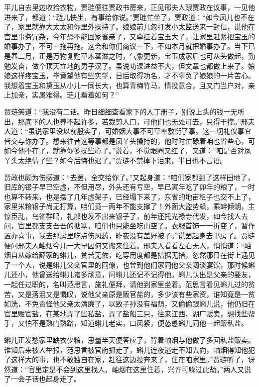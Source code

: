 \documentclass[12pt,oneside]{book}
\begin{document}
平儿自去里边收拾衣物，贾琏便往贾政书房来，正见邢夫人跟贾政在议事，一见他进来了，都道：“琏儿快坐，有事给你说。”贾琏忙坐了，贾政道：“如今凤儿也不在了，家里就靠大太太和你里外操持了。娘娘前儿忽打发小太监送来一封信，说他在宫里事务冗杂，今年恐不能回家省亲了，又牵挂着宝玉大了，让家里赶紧把宝玉的婚事办了，不可一拖再拖。这会和你们商议一下，不如本月就把婚事办了。当下已是春二月，正是万物复甦草木蕃滋之时，气象更新，宝玉成家后也可从头做起，勤勉发奋，做个顶天立地的男子汉了。虽说功课进益不大，但文章也都做上来了。娘娘这样疼宝玉，毕竟望他有些实学，日后取得功名，才不辜负了娘娘的一片苦心。我想着宝玉和黛玉从小儿一同长大，也算青梅竹马，情投意合，且又门当户对，亲上加亲，实属难得。琏儿看着如何？”

贾琏笑道：“我没有二话。昨日细细查看家下的人丁册子，别说上头的钱一无所出，那底下的人也养不起许多，若裁剪人口，可他们也无处可去，只得干撑。”邢夫人道：“虽说家里没以前殷实了，可婚姻大事不可草率敷衍了事。这一切礼仪事宜皆交与你办了。想来往昔这等事都是凤丫头操持的，他时时忙碌着咱也省些心，可如今他不在了，就靠你多操些心了。”说着，不觉眼圈又红了，又道：“咱是否对凤丫头太绝情了些？如今后悔也迟了。”贾琏不禁掉下泪来，半日也不言语。

贾政也颇为伤感道：“去罢，全交给你了。”又起身道：“咱们家都到了这样田地了，旧库的银子早已空虚，不但用尽，外头还有亏空，早已寅年吃了卯年的粮了，一时也算不转来，也是摆了几年虚架子，已经塌下来了，东省的地亩租子也交不上了，家里米粮银子尚无打算，咱们竟一两年不能支撑了！外面大盗势飙，乘衅倾朝，主惊臣乱，乌雀群鸣，礼部也发不出来银子了，前年还托光禄寺代发，如今找人去问，官里都支支吾吾的搪塞，咱们也只能坐吃山空了。衣服首饰一一折变了，暂作置办喜事，我去那房里吃点伤风药，昨夜没有盖好被子。”说罢起身去书房了。贾琏便问邢夫人岫烟今儿一大早因何又搬来住着。邢夫人看看左右无人，悄悄道：“岫烟自从嫁给薛家的蝌儿，贫苦无依，吃穿用度都是拮据无措，忽然那日在街上遇见了一个人，说是蝌儿父亲官里的同僚，也曾到他们家同他父亲阔谈宴饮，那时候蝌儿还小，他曾送给蝌儿诸多顽意，问蝌儿还记不记得他。蝌儿认出是父亲的要友，一起任过职的，名叫范思言，施礼便拜，请他到家里坐着。范思言看见蝌儿过的贫苦，又是落泪又是慨叹，说他父亲原是贩官盐的，多少该有些家资，谁知竟是一贫如洗，不免责怪他父亲太清廉了，以致子孙没有福荫，又偷偷跟蝌儿说，他仍旧在官里贩官盐，在某地弄了些私盐，弄了盐船三只，往来江西、湖广贩卖，想找些帮手，又怕不是熟门熟路，知道蝌儿老实，口风紧，便怂恿蝌儿同他一起贩私盐。

蝌儿正发愁家里缺衣少粮，思量半天便答应了，背着岫烟与他做了多回私盐贩卖。谁知后来被人举报，范思言被官府抓走了，蝌儿连夜逃走不知去向，岫烟得知他犯了这样大的事，也不敢独自在家，赶往这边投奔来了，住在咱家里。”贾琏听了，讶然道：“官里定是不会到这里找人，岫烟在这里住着，兴许可躲过此劫。”两人又说了一会子话也起身走了。
\end{document}
